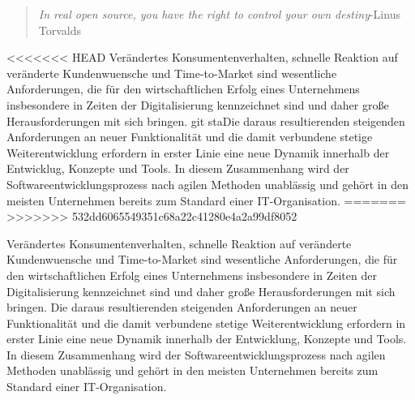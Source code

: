 \begin{quote}
\textit{In real open source, you have the right to control your own destiny}\newline -Linus Torvalds
\end{quote}

<<<<<<< HEAD
Verändertes Konsumentenverhalten, schnelle Reaktion auf veränderte Kundenwuensche und Time-to-Market sind wesentliche Anforderungen, die für den wirtschaftlichen Erfolg eines Unternehmens insbesondere in Zeiten der Digitalisierung kennzeichnet sind und daher große Herausforderungen mit sich bringen. git staDie daraus resultierenden steigenden Anforderungen an neuer Funktionalität und die damit verbundene stetige Weiterentwicklung erfordern in erster Linie eine neue Dynamik innerhalb der Entwicklug, Konzepte und Tools. In diesem Zusammenhang wird der Softwareentwicklungsprozess nach agilen Methoden unablässig und gehört in den meisten Unternehmen bereits zum Standard einer IT-Organisation. 
=======
>>>>>>> 532dd6065549351c68a22c41280e4a2a99df8052

Verändertes Konsumentenverhalten, schnelle Reaktion auf veränderte Kundenwuensche und Time-to-Market sind wesentliche Anforderungen, die für den wirtschaftlichen Erfolg eines Unternehmens insbesondere in Zeiten der Digitalisierung kennzeichnet sind und daher große Herausforderungen mit sich bringen.
Die daraus resultierenden steigenden Anforderungen an neuer Funktionalität  und die damit verbundene stetige Weiterentwicklung erfordern in erster Linie eine neue Dynamik innerhalb der Entwicklung, Konzepte und Tools.
In diesem Zusammenhang wird der Softwareentwicklungsprozess nach agilen Methoden unablässig und gehört in den meisten Unternehmen bereits zum Standard einer IT-Organisation. 


